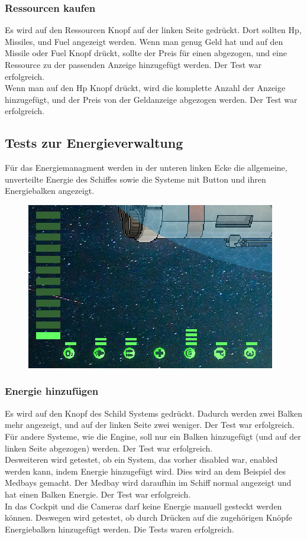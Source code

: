 \documentclass[fontsize=12pt,paper=a4,twoside]{scrartcl}
\begin{document}
\subsubsection{Ressourcen kaufen}
Es wird auf den Ressourcen Knopf auf der linken Seite gedrückt. Dort sollten Hp, Missiles, und Fuel angezeigt werden. Wenn man genug Geld hat und auf den Missile oder Fuel Knopf drückt, sollte der Preis für einen abgezogen, und eine Ressource zu der passenden Anzeige hinzugefügt werden.  Der Test war erfolgreich. \\
Wenn man auf den Hp Knopf drückt, wird die komplette Anzahl der Anzeige hinzugefügt, und der Preis von der Geldanzeige abgezogen werden.  Der Test war erfolgreich. \\



\subsection{Tests zur Energieverwaltung}
Für das Energiemanagment werden in der unteren linken Ecke die allgemeine, unverteilte Energie des Schiffes sowie die Systeme mit Button und ihren Energiebalken angezeigt. \\
\begin{figure}[h!]
\centering
\includegraphics[width=0.5\linewidth]{images/energy1.png}
\end{figure}
\subsubsection{Energie hinzufügen}
Es wird auf den Knopf des Schild Systems gedrückt. Dadurch werden zwei Balken mehr angezeigt, und auf der linken Seite zwei weniger. Der Test war erfolgreich. \\
Für andere Systeme, wie die Engine, soll nur ein Balken hinzugefügt (und auf der linken Seite abgezogen) werden. Der Test war erfolgreich. \\
Desweiteren wird getestet, ob ein System, das vorher disabled war, enabled werden kann, indem Energie hinzugefügt wird. Dies wird an dem Beispiel des Medbays gemacht. Der Medbay wird daraufhin im Schiff normal angezeigt und hat einen Balken Energie. Der Test war erfolgreich. \\
In das Cockpit und die Cameras darf keine Energie manuell gesteckt werden können. Deswegen wird getestet, ob durch Drücken auf die zugehörigen Knöpfe Energiebalken hinzugefügt werden. Die Tests waren erfolgreich. \\
\end{document}
